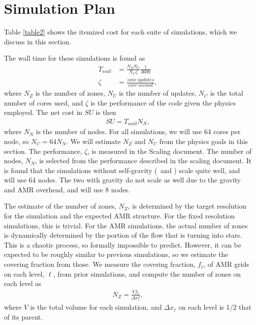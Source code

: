 \section{Simulation Plan}
\label{sec.plan}



Table \ref{table2} shows the itemized cost for each suite of simulations, which
we discuss in this section.

The wall time for these simulations is found as
\begin{align}
    T_{wall} &= \frac{N_Z N_U}{N_C \zeta} \frac{1}{3600}\label{eqn.twall}\\
    \zeta &= \frac{zone\ updates}{core\ second},
\end{align}
where $N_Z$ is the number of zones, $N_U$ is the number of updates, $N_C$ is the
total number of cores used, and $\zeta$ is the performance of the code given the
physics employed.  The net cost in $SU$ is then
\begin{align}
    SU = T_{wall} N_N, \label{eqn.su}
\end{align}
where $N_N$ is the number of nodes.  For all simulations, we will use 64 cores
per node, so $N_C=64 N_N$.  We will estimate $N_Z$ and $N_U$ from the physics
goals in this section.  The performance, $\zeta$, is measured in the Scaling
document.  The number of nodes, $N_N$, is selected from the performance
described in the scaling document.  It is found that the simulations without
self-gravity (\nameCMB\ and \nameTurbulence) scale quite well, and will use 64
nodes.  The two with gravity do not scale as well due to the gravity and AMR
overhead, and will use 8 nodes.

The estimate of the number of zones, $N_Z$,
is determined by the target resolution for the simulation and the expected AMR
structure.  For the fixed
resolution simulations, this is trivial.  
For the AMR
simulations, the actual number of zones  
 is dynamically determined by the portion of the flow
that is turning into stars.  
This is a chaotic process, so formally impossible
to predict.
However, it can be expected to be roughly similar to
previous simulations, so we estimate the covering fraction from those.   
We measure the covering fraction, $f_\ell$, of AMR grids on each level, $\ell$,
from prior simulations, and compute the number of zones on each level as
\begin{align}
    N_Z = \frac{V f_\ell}{\Delta x_\ell^3},
\end{align}
where $V$ is the total volume for each simulation, and $\Delta x_\ell$ on each
level is 1/2 that of its parent.

